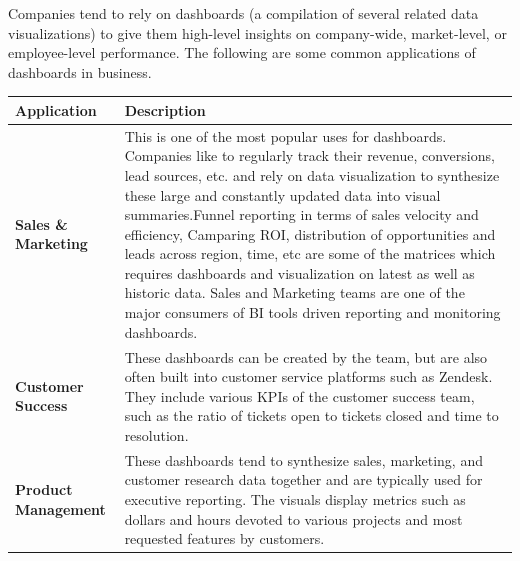 \documentclass[]{book}
\begin{document}
Companies tend to rely on dashboards (a compilation of several related data visualizations) to give them high-level insights on company-wide, market-level, or employee-level performance. The following are some common applications of dashboards in business.

\begin{longtable}[]{@{}ll@{}}
\toprule
\begin{minipage}[b]{0.15\columnwidth}\raggedright
\textbf{Application}\strut
\end{minipage} & \begin{minipage}[b]{0.79\columnwidth}\raggedright
\textbf{Description}\strut
\end{minipage}\tabularnewline
\midrule
\endhead
\begin{minipage}[t]{0.15\columnwidth}\raggedright
\textbf{Sales \& Marketing}\strut
\end{minipage} & \begin{minipage}[t]{0.79\columnwidth}\raggedright
This is one of the most popular uses for dashboards. Companies like to regularly track their revenue, conversions, lead sources, etc. and rely on data visualization to synthesize these large and constantly updated data into visual summaries.Funnel reporting in terms of sales velocity and efficiency, Camparing ROI, distribution of opportunities and leads across region, time, etc are some of the matrices which requires dashboards and visualization on latest as well as historic data. Sales and Marketing teams are one of the major consumers of BI tools driven reporting and monitoring dashboards.\strut
\end{minipage}\tabularnewline
\begin{minipage}[t]{0.15\columnwidth}\raggedright
\textbf{Customer Success}\strut
\end{minipage} & \begin{minipage}[t]{0.79\columnwidth}\raggedright
These dashboards can be created by the team, but are also often built into customer service platforms such as Zendesk. They include various KPIs of the customer success team, such as the ratio of tickets open to tickets closed and time to resolution.\strut
\end{minipage}\tabularnewline
\begin{minipage}[t]{0.15\columnwidth}\raggedright
\textbf{Product Management}\strut
\end{minipage} & \begin{minipage}[t]{0.79\columnwidth}\raggedright
These dashboards tend to synthesize sales, marketing, and customer research data together and are typically used for executive reporting. The visuals display metrics such as dollars and hours devoted to various projects and most requested features by customers.\strut

\end{minipage}
\end{longtable}
\end{document}
